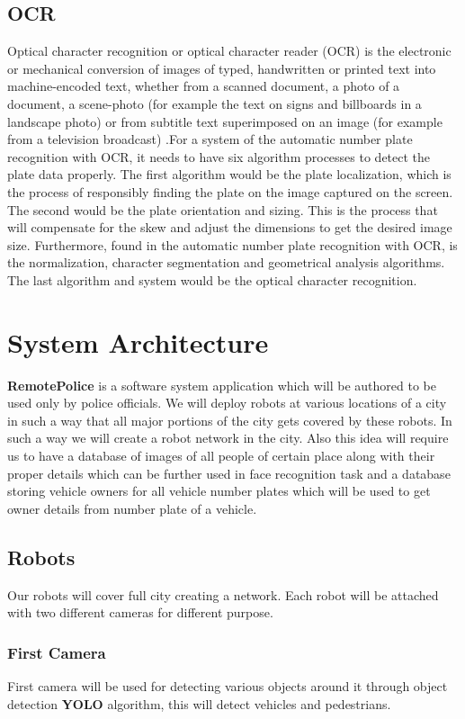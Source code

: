 \documentclass[10pt,twocolumn,letterpaper]{article}
\begin{document}
 \subsection{OCR}
 Optical character recognition or optical character reader (OCR) is the electronic or mechanical conversion of images of typed, handwritten or printed text into machine-encoded text, whether from a scanned document, a photo of a document, a scene-photo (for example the text on signs and billboards in a landscape photo) or from subtitle text superimposed on an image (for example from a television broadcast) \cite{ocr}.For a system of the automatic number plate recognition with OCR, it needs to have six algorithm processes to detect the plate data properly. The first algorithm would be the plate localization, which is the process of responsibly finding the plate on the image captured on the screen. The second would be the plate orientation and sizing. This is the process that will compensate for the skew and adjust the dimensions to get the desired image size. Furthermore, found in the automatic number plate recognition with OCR, is the normalization, character segmentation and geometrical analysis algorithms. The last algorithm and system would be the optical character recognition.

\section{System Architecture}
\textbf{RemotePolice} is a software system application which will be authored to be used only by police officials. We will deploy robots at various locations of a city in such a way that all major portions of the city gets covered by these robots. In such a way we will create a robot network in the city. Also this idea will require us to have a database of images of all people of certain place along with their proper details which can be further used in face recognition task and a database storing vehicle owners for all vehicle number plates which will be used to get owner details from number plate of a vehicle.
\subsection{Robots}
Our robots will cover full city creating a network. Each robot will be attached with two different cameras for different purpose. 

\subsubsection{First Camera}
First camera will be used for detecting various objects around it through object detection \textbf{YOLO} algorithm, this will detect vehicles and pedestrians.
\end{document}
